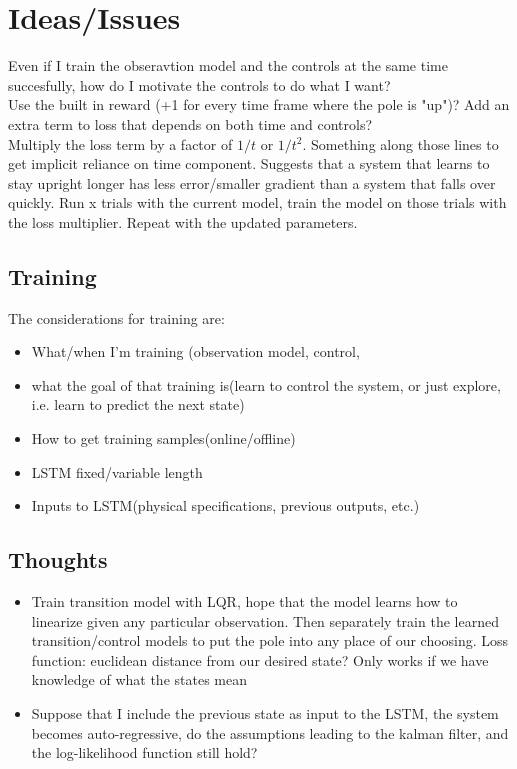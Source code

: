 \documentclass[twoside]{article}
\begin{document}
\section{Ideas/Issues}
Even if I train the obseravtion model and the controls at the same time succesfully, how do I motivate the controls to do what I want?\\
Use the built in reward (+1 for every time frame where the pole is "up")? Add an extra term to loss that depends on both time and controls?\\
Multiply the loss term by a factor of $1/t$ or $1/t^{2}$. Something along those lines to get implicit reliance on time component. Suggests that a system that learns to stay upright longer has less error/smaller gradient than a system that falls over quickly.
Run x trials with the current model, train the model on those trials with the loss multiplier. Repeat with the updated parameters.
\subsection{Training}
The considerations for training are:
\begin{itemize}
\item What/when I'm training (observation model, control, 
\item what the goal of that training is(learn to control the system, or just explore, i.e. learn to predict the next state)
\item How to get training samples(online/offline)
\item LSTM fixed/variable length
\item Inputs to LSTM(physical specifications, previous outputs, etc.)
\end{itemize}
\subsection{Thoughts}
\begin{itemize}
\item Train transition model with LQR, hope that the model learns how to linearize given any particular observation. Then separately train the learned transition/control models to put the pole into any place of our choosing. 
Loss function: euclidean distance from our desired state? Only works if we have knowledge of what the states mean
\item Suppose that I include the previous state as input to the LSTM, the system becomes auto-regressive, do the assumptions leading to the kalman filter, and the log-likelihood function still hold?
\end{itemize}
\end{document}
